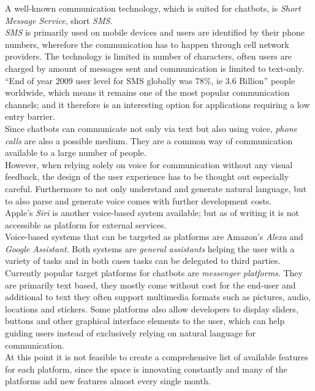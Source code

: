 A well-known communication technology, which is suited for chatbots, is \emph{Short Message Service}, short \emph{SMS}.
\\
\emph{SMS} is primarily used on mobile devices and users are identified by their phone numbers,
wherefore the communication has to happen through cell network providers.
The technology is limited in number of characters, often users are charged by amount of messages sent and communication is limited to text-only.
``End of year 2009 user level for SMS globally was 78\%, ie 3.6 Billion''\cite{mobilenumbers} people worldwide,
which means it remains one of the most popular communication channels;
and it therefore is an interesting option for applications requiring a low entry barrier.
\\

Since chatbots can communicate not only via text but also using voice, \emph{phone calls} are also a possible medium.
They are a common way of communication available to a large number of people.
\\
However, when relying solely on voice for communication without any visual feedback, the design of the user experience has to be thought out especially careful.
Furthermore to not only understand and generate natural language,
but to also parse and generate voice comes with further development costs.
\\

Apple's \emph{Siri} is another voice-based system available; but as of writing it is not accessible as platform for external services.
\\
Voice-based systems that can be targeted as platforms are Amazon's \emph{Alexa} and \emph{Google Assistant}.
Both systems are \emph{general assistants} helping the user with a variety of tasks
and in both cases tasks can be delegated to third parties.
\\

Currently popular target platforms for chatbots are \emph{messenger platforms}.
They are primarily text based, they mostly come without cost for the end-user and additional to text they often support multimedia formats such as pictures, audio, locations and stickers.
Some platforms also allow developers to display sliders, buttons and other graphical interface elements to the user, which can help guiding users instead of exclusively relying on natural language for communication.
\\
At this point it is not feasible to create a comprehensive list of available features for each platform, since the space is innovating constantly and many of the platforms add new features almost every single month.
\\

